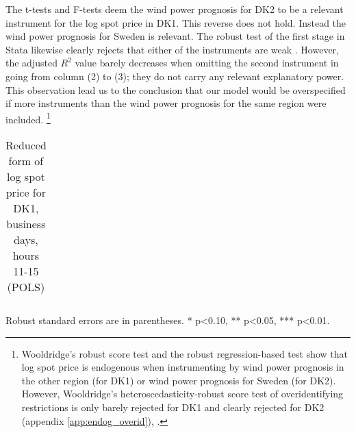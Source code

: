 The t-tests and F-tests deem the wind power prognosis for DK2 to be a relevant instrument for the log spot price in DK1. This reverse does not hold. Instead the wind power prognosis for Sweden is relevant. The robust test of the first stage in Stata likewise clearly rejects that either of the instruments are weak \citep{statacorp2017stata}. However, the adjusted $R^2$ value barely decreases when omitting the second instrument in going from column (2) to (3); they do not carry any relevant explanatory power. This observation lead us to the conclusion that our model would be overspecified if more instruments than the wind power prognosis for the same region were included. \footnote{Wooldridge's robust score test and the robust regression-based test show that log spot price is endogenous when instrumenting by wind power prognosis in the other region (for DK1) or wind power prognosis for Sweden (for DK2). However, Wooldridge's heteroscedasticity-robust score test of overidentifying restrictions is only barely rejected for DK1 and clearly rejected for DK2 (appendix \ref{app:endog_overid}), \citep{statacorp2017stata}.}
\begin{table}[H]
\begin{threeparttable}
  \centering
  \caption{Reduced form of log spot price for DK1, business days, hours 11-15 (POLS)}
  \label{tab:reduced_form_price_dk1}
  \footnotesize
  \begin{tabular}{lcccc}
         
  \end{tabular}
    \begin{tablenotes}
        \item Robust standard errors are in parentheses. * p<0.10, ** p<0.05, *** p<0.01.
    \end{tablenotes}
\end{threeparttable}
\end{table}


